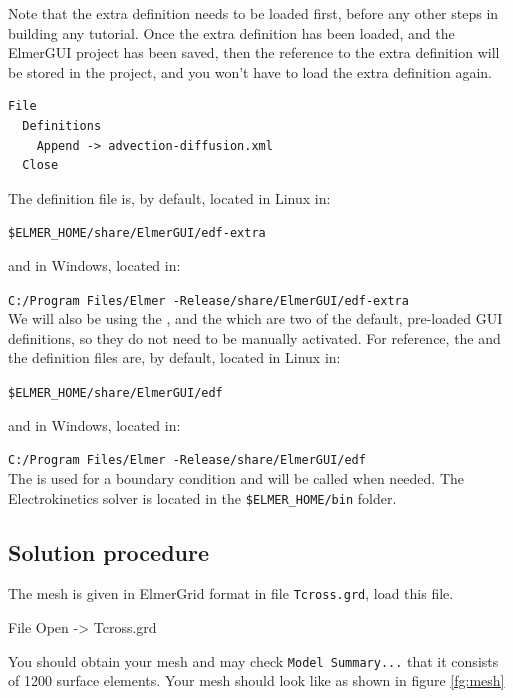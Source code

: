 Note that the extra definition needs to be loaded first, before any other steps in building any tutorial.  Once the extra definition has been loaded, and the ElmerGUI project has been saved, then the reference to the extra definition will be stored in the project, and you won't have to load the extra definition again.

\begin{verbatim}
File
  Definitions
    Append -> advection-diffusion.xml
  Close
\end{verbatim}

\noindent The \texttt{} definition file is, by default, located in Linux in:

\texttt{\$ELMER\_HOME/share/ElmerGUI/edf-extra}

\noindent and in Windows, located in:

\texttt{C:/Program Files/Elmer \elmerversion{}-Release/share/ElmerGUI/edf-extra}\\

We will also be using the , and the   which are two of the default, pre-loaded GUI definitions, so they do not need to be manually activated.  For reference, the  \texttt{}  and the  \texttt{} definition files are, by default, located in Linux in:

\texttt{\$ELMER\_HOME/share/ElmerGUI/edf}

\noindent and in Windows, located in:

\texttt{C:/Program Files/Elmer \elmerversion{}-Release/share/ElmerGUI/edf}\\

The  is used for a boundary condition and will be called when needed.  The Electrokinetics solver is located in the \texttt{\$ELMER\_HOME/bin} folder.

\subsection*{Solution procedure}

The mesh is given in ElmerGrid format in file \texttt{Tcross.grd}, load this file.

\ttbegin
File 
  Open -> Tcross.grd
\ttend

You should obtain your mesh and may check \texttt{Model Summary...} that it consists of 1200 surface elements.  Your mesh should look like as shown in figure \ref{fg:mesh}

